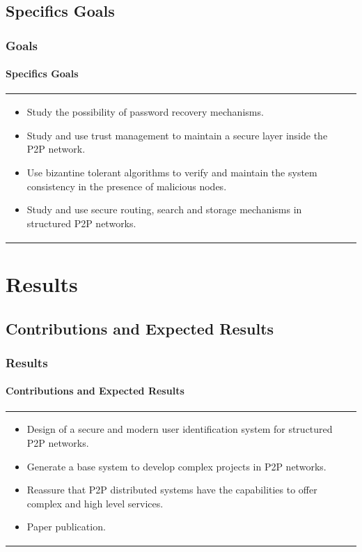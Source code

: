 \documentclass[12pt]{beamer}
\begin{document}
  \subsection{Specifics Goals}
    \begin{frame}
    \frametitle{Goals}
    \framesubtitle{Specifics Goals}
    \begin{table}
    \begin{tabular}{p{7cm}p{3cm}}
    \begin{itemize}
      \item Study the possibility of password recovery mechanisms.
      \item Study and use trust management to maintain a
            secure layer inside the P2P network.
      \item Use bizantine tolerant algorithms to verify and maintain the
            system consistency in the presence of malicious nodes.
      \item Study and use secure routing, search and storage mechanisms in
            structured P2P networks.
    \end{itemize}
    &
    \vspace{1.5cm}
    \end{tabular}
    \end{table}
    \end{frame}
  \section{Results}
  \subsection{Contributions and Expected Results}
    \begin{frame}
    \frametitle{Results}
    \framesubtitle{Contributions and Expected Results}
    \begin{table}
    \begin{tabular}{p{7cm}p{3cm}}
      \begin{itemize}
          \item Design of a secure and modern user identification system for
                structured P2P networks.
          \item Generate a base system to develop complex projects in P2P networks.
          \item Reassure that P2P distributed systems have the capabilities to offer
                complex and high level services.
          \item Paper publication.
      \end{itemize}
    &
    \vspace{1.5cm}
    \end{tabular}
    \end{table}
    \end{frame}
\end{document}
